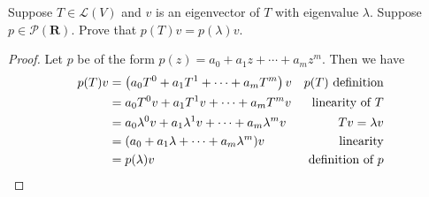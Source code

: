 Suppose $T \in \mathcal{L}(V)$ and $v$ is an eigenvector of $T$ with eigenvalue $\lambda$.  Suppose $p \in \mathcal{P}(\mathbf{R})$.  Prove that $p(T)v = p(\lambda)v$.
\begin{mybox}
    \begin{proof}
        Let $p$ be of the form $p(z) = a_0 + a_1 z + \cdots + a_m z^m$. Then we have
        \begin{align*}
            p(T)v &= \left( {a_0 T^0 + a_1 T^1 + \cdots + a_m T^m} \right)v & p(T)\text{ definition} \\
            &= a_0 T^0v + a_1 T^1v + \cdots + a_m T^mv & \text{linearity of } T\\
            &= a_0 \lambda^0 v + a_1 \lambda^1v + \cdots + a_m \lambda^mv & Tv = \lambda v\\
            &= ( a_0 + a_1 \lambda + \cdots + a_m \lambda^m )v & \text{linearity}\\
            &= p(\lambda)v & \text{definition of } p
        \end{align*}
    \end{proof}
\end{mybox}